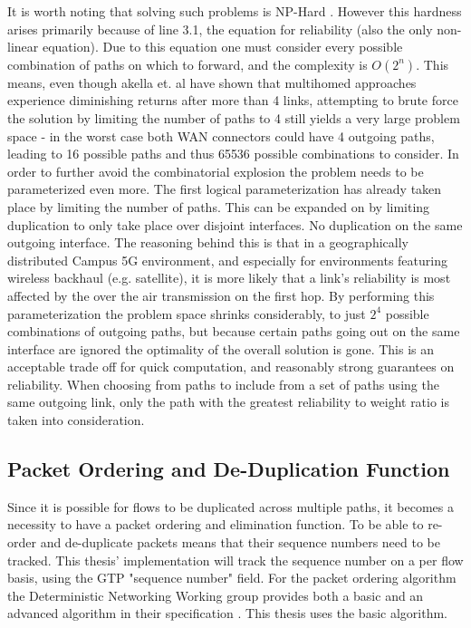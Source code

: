 It is worth noting that solving such problems is NP-Hard \cite{tsp-np-hard}. However this hardness arises primarily because of line 3.1, the equation for reliability (also the only non-linear equation). Due to this equation one must consider every possible combination of paths on which to forward, and the complexity is $O(2^n)$. This means, even though akella et. al \cite{akella2003measurement} have shown that multihomed approaches experience diminishing returns after more than 4 links, attempting to brute force the solution by limiting the number of paths to 4 still yields a very large problem space - in the worst case both WAN connectors could have 4 outgoing paths, leading to 16 possible paths and thus 65536 possible combinations to consider. In order to further avoid the combinatorial explosion the problem needs to be parameterized even more. The first logical parameterization has already taken place by limiting the number of paths. This can be expanded on by limiting duplication to only take place over disjoint interfaces. No duplication on the same outgoing interface. The reasoning behind this is that in a geographically distributed Campus 5G environment, and especially for environments featuring wireless backhaul (e.g. satellite), it is more likely that a link's reliability is most affected by the over the air transmission on the first hop. By performing this parameterization the problem space shrinks considerably, to just $2^4$ possible combinations of outgoing paths, but because certain paths going out on the same interface are ignored the optimality of the overall solution is gone. This is an acceptable trade off for quick computation, and reasonably strong guarantees on reliability. When choosing from paths to include from a set of paths using the same outgoing link, only the path with the greatest reliability to weight ratio is taken into consideration.

\subsection{Packet Ordering and De-Duplication Function}

Since it is possible for flows to be duplicated across multiple paths, it becomes a necessity to have a packet ordering and elimination function. To be able to re-order and de-duplicate packets means that their sequence numbers need to be tracked. This thesis' implementation will track the sequence number on a per flow basis, using the GTP "sequence number" field. For the packet ordering algorithm the Deterministic Networking Working group provides both a basic and an advanced algorithm in their specification \cite{detnet-pof}. This thesis uses the basic algorithm.


